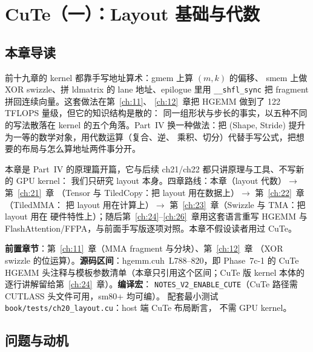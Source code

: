 \makeatletter
\providecommand{\urlchbrk}[1]{\@tfor\next:=#1\do{\next\allowbreak}}
\makeatother
\providecommand{\url}[1]{{\ttfamily\urlchbrk{#1}}}
\chapter{CuTe（一）：Layout 基础与代数}\label{ch:20}

\section{本章导读}

前十九章的 kernel 都靠手写地址算术：gmem 上算 $(m,k)$ 的偏移、
smem 上做 XOR swizzle、拼 ldmatrix 的 lane 地址、epilogue 里用 \texttt{\_\_shfl\_sync}
把 fragment 拼回连续向量。这套做法在第~\ref{ch:11}、
\ref{ch:12}~章把 HGEMM 做到了 122 TFLOPS 量级，但它的知识结构是散的：
同一组形状与步长的事实，以五种不同的写法散落在 kernel 的五个角落。Part~IV
换一种做法：把 (Shape, Stride) 提升为一等的数学对象，用代数运算（复合、逆、
乘积、切分）代替手写公式，把想要的布局与怎么算地址两件事分开。

本章是 Part~IV 的原理篇开篇，它与后续 ch21/ch22 都只讲原理与工具、不写新的 GPU kernel：
我们只研究 layout 本身。四章路线：本章（layout 代数）$\to$ 第~\ref{ch:21}~章
（Tensor 与 TiledCopy：把 layout 用在数据上）$\to$ 第~\ref{ch:22}~章（TiledMMA：
把 layout 用在计算上）$\to$ 第~\ref{ch:23}~章（Swizzle 与 TMA：把 layout 用在
硬件特性上）；随后第~\ref{ch:24}--\ref{ch:26}~章用这套语言重写 HGEMM 与
FlashAttention/FFPA，与前面手写版逐项对照。本章不假设读者用过 CuTe。

\textbf{前置章节}：第~\ref{ch:11}~章（MMA fragment 与分块）、第~\ref{ch:12}~章
（XOR swizzle 的位运算）。\textbf{源码区间}：hgemm.cuh~L788--820，即
Phase~7c-1 的 CuTe HGEMM 头注释与模板参数清单（本章只引用这个区间；CuTe 版
kernel 本体的逐行讲解留给第~\ref{ch:24}~章）。\textbf{编译宏}：
\texttt{NOTES\_\allowbreak{}V2\_\allowbreak{}ENABLE\_\allowbreak{}CUTE}（CuTe 路径需 CUTLASS 头文件可用，sm80+ 均可编）。
配套最小测试 \texttt{book/\allowbreak{}tests/\allowbreak{}ch20\_\allowbreak{}layout.\allowbreak{}cu}：host 端 CuTe 布局断言，
不需 GPU kernel。

\section{问题与动机}

